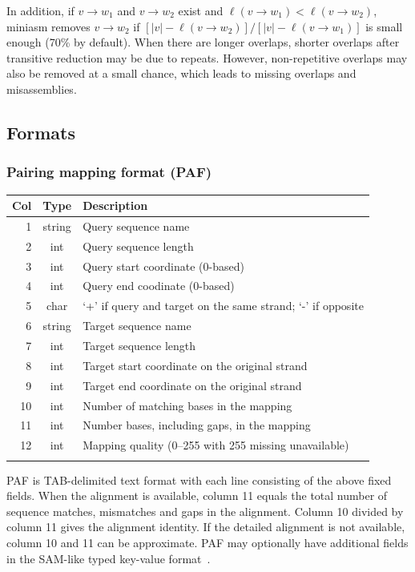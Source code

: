 \documentclass{bioinfo}
\begin{document}
\begin{methods}
In addition, if $v\to w_1$ and $v\to w_2$ exist and $\ell(v\to w_1)<\ell(v\to
w_2)$, miniasm removes $v\to w_2$ if $[|v|-\ell(v\to w_2)]/[|v|-\ell(v\to
w_1)]$ is small enough (70\% by default). When there are longer overlaps,
shorter overlaps after transitive reduction may be due to repeats.
However, non-repetitive overlaps may also be removed at a small chance, which
leads to missing overlaps and misassemblies.

\subsection{Formats}

\subsubsection{Pairing mapping format (PAF)}

\begin{table}[tb]\label{tab:paf}
{\footnotesize
\begin{tabular}{rcl}
\toprule
Col & Type & Description \\
\midrule
1 & string & Query sequence name \\
2 & int    & Query sequence length \\
3 & int    & Query start coordinate (0-based) \\
4 & int    & Query end coodinate (0-based) \\
5 & char   & `+' if query and target on the same strand; `-' if opposite \\
6 & string & Target sequence name \\
7 & int    & Target sequence length \\
8 & int    & Target start coordinate on the original strand \\
9 & int    & Target end coordinate on the original strand \\
10& int    & Number of matching bases in the mapping \\
11& int    & Number bases, including gaps, in the mapping \\
12& int    & Mapping quality (0--255 with 255 missing unavailable) \\
\botrule
\end{tabular}
}{PAF is TAB-delimited text format with each line consisting of the above fixed
fields. When the alignment is available, column 11 equals the total number of
sequence matches, mismatches and gaps in the alignment. Column 10 divided by
column 11 gives the alignment identity. If the detailed alignment is not
available, column 10 and 11 can be approximate. PAF may optionally have
additional fields in the SAM-like typed key-value format~\citep{Li:2009ys}.}
\end{table}


\end{methods}
\end{document}
